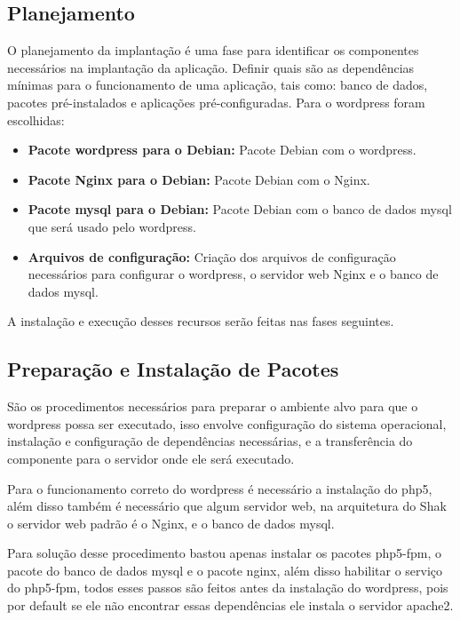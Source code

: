 \subsection{Planejamento}

O planejamento da implantação é uma fase para identificar os componentes
necessários na implantação da aplicação. Definir quais são as dependências mínimas
para o funcionamento de uma aplicação, tais como: banco de dados, pacotes
pré-instalados e aplicações pré-configuradas. Para o wordpress foram escolhidas:

\begin{itemize}
   \item \textbf{Pacote wordpress para o Debian:} Pacote Debian com o wordpress.
   \item \textbf{Pacote Nginx para o Debian:} Pacote Debian com o Nginx.
   \item \textbf{Pacote mysql para o Debian:} Pacote Debian com o banco de dados mysql
   que será usado pelo wordpress.
   \item \textbf{Arquivos de configuração:} Criação dos arquivos de configuração
   necessários para configurar o wordpress, o servidor web Nginx e o banco de dados
   mysql.
\end{itemize}

A instalação e execução desses recursos serão feitas nas fases seguintes.

\subsection{Preparação e Instalação de Pacotes}
\label{wordpress:preparacao}

São os procedimentos necessários para preparar o ambiente alvo para que o wordpress
possa ser executado, isso envolve configuração do sistema operacional, instalação
e configuração de dependências necessárias, e a transferência do componente
para o servidor onde ele será executado.

Para o funcionamento correto do wordpress é necessário a instalação do php5, além
disso também é necessário que algum servidor web, na arquitetura do Shak o servidor
web padrão é o Nginx, e o banco de dados mysql.

Para solução desse procedimento bastou apenas instalar os pacotes php5-fpm, o pacote
do banco de dados mysql e o pacote nginx, além disso habilitar o serviço do
php5-fpm, todos esses passos são feitos antes da instalação do wordpress,
pois por default se ele não encontrar essas dependências ele instala o servidor
apache2.

